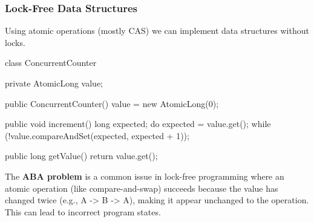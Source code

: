 \subsubsection{Lock-Free Data Structures}

\begin{remark}
    Using atomic operations (mostly CAS) we can implement data structures without locks. 
\end{remark}

\begin{codeexample}
class ConcurrentCounter {
    private AtomicLong value;
    
    public ConcurrentCounter() {
        value = new AtomicLong(0);
    }
    
    public void increment() {
        long expected;
        do {
            expected = value.get();
        } while (!value.compareAndSet(expected, expected + 1));
    }
    
    public long getValue() {
        return value.get();
    }
}
\end{codeexample}

\begin{important}
    The \textbf{ABA problem} is a common issue in lock-free programming where an atomic operation (like compare-and-swap) succeeds because the value has changed twice (e.g., A -> B -> A), making it appear unchanged to the operation. This can lead to incorrect program states.
\end{important}
